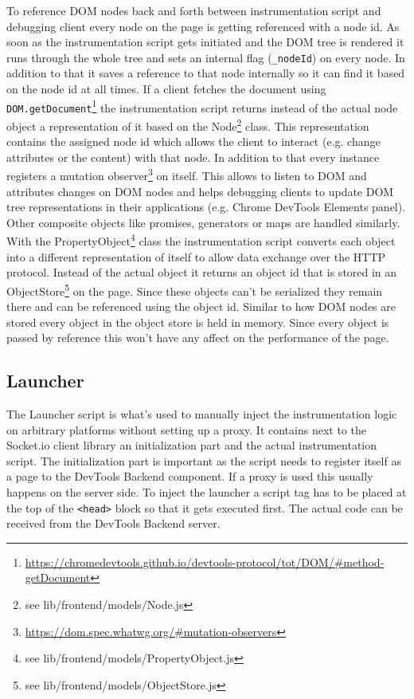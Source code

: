 To reference DOM nodes back and forth between instrumentation script and debugging client every node on the page is getting referenced with a node id. As soon as the instrumentation script gets initiated and the DOM tree is rendered it runs through the whole tree and sets an internal flag (\texttt{\_nodeId}) on every node. In addition to that it saves a reference to that node internally so it can find it based on the node id at all times. If a client fetches the document using \texttt{DOM.getDocument}\footnote{\url{https://chromedevtools.github.io/devtools-protocol/tot/DOM/\#method-getDocument}} the instrumentation script returns instead of the actual node object a representation of it based on the Node\footnote{see lib/frontend/models/Node.js} class. This representation contains the assigned node id which allows the client to interact (e.g. change attributes or the content) with that node. In addition to that every instance registers a mutation observer\footnote{\url{https://dom.spec.whatwg.org/\#mutation-observers}} on itself. This allows to listen to DOM and attributes changes on DOM nodes and helps debugging clients to update DOM tree representations in their applications (e.g. Chrome DevTools Elements panel). Other composite objects like promises, generators or maps are handled similarly. With the PropertyObject\footnote{see lib/frontend/models/PropertyObject.js} class the instrumentation script converts each object into a different representation of itself to allow data exchange over the HTTP protocol. Instead of the actual object it returns an object id that is stored in an ObjectStore\footnote{see lib/frontend/models/ObjectStore.js} on the page. Since these objects can't be serialized they remain there and can be referenced using the object id. Similar to how DOM nodes are stored every object in the object store is held in memory. Since every object is passed by reference this won't have any affect on the performance of the page.

\subsection{Launcher\label{sec:launcher}}

The Launcher script is what's used to manually inject the instrumentation logic on arbitrary platforms without setting up a proxy. It contains next to the Socket.io client library an initialization part and the actual instrumentation script. The initialization part is important as the script needs to register itself as a page to the DevTools Backend component. If a proxy is used this usually happens on the server side. To inject the launcher a script tag has to be placed at the top of the \texttt{<head>} block so that it gets executed first. The actual code can be received from the DevTools Backend server.

